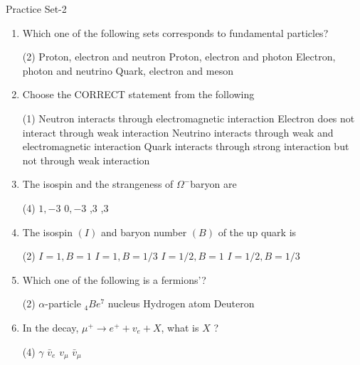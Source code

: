 \begin{abox}
Practice Set-2
\end{abox}
\begin{enumerate}
	\item  Which one of the following sets corresponds to fundamental particles?
	 {}
	 \begin{tasks}(2)
		\task[\textbf{a.}]Proton, electron and neutron
		\task[\textbf{b.}]Proton, electron and photon
		\task[\textbf{c.}]Electron, photon and neutrino
		\task[\textbf{d.}]Quark, electron and meson 
	\end{tasks}

	\item  Choose the CORRECT statement from the following
	 \begin{tasks}(1)
		\task[\textbf{a.}]Neutron interacts through electromagnetic interaction
		\task[\textbf{b.}]Electron does not interact through weak interaction
		\task[\textbf{c.}]Neutrino interacts through weak and electromagnetic interaction
		\task[\textbf{d.}] Quark interacts through strong interaction but not through weak interaction
	\end{tasks}

	\item  The isospin and the strangeness of $\Omega^{-}$baryon are
	{}
	 \begin{tasks}(4)
		\task[\textbf{a.}]$1,-3$
		\task[\textbf{b.}]$0,-3$
		,3
		,3 
	\end{tasks}

	\item The isospin $(I)$ and baryon number $(B)$ of the up quark is
	{}
	 \begin{tasks}(2)
		\task[\textbf{a.}]$I=1, B=1$
		\task[\textbf{b.}]$I=1, B=1 / 3$
		\task[\textbf{c.}]$I=1 / 2, B=1$
		\task[\textbf{d.}]$I=1 / 2, B=1 / 3$ 
	\end{tasks}

	\item  Which one of the following is a fermions'?
	{}
	 \begin{tasks}(2)
		\task[\textbf{a.}]$\alpha$-particle
		\task[\textbf{b.}]${ }_4 B e^7$ nucleus
		\task[\textbf{c.}]Hydrogen atom
		\task[\textbf{d.}]Deuteron 
	\end{tasks}

	\item  In the decay, $\mu^{+} \rightarrow e^{+}+v_e+X$, what is $X$ ?
	{}
	 \begin{tasks}(4)
		\task[\textbf{a.}]$\gamma$
		\task[\textbf{b.}]$\bar{v}_e$
		\task[\textbf{c.}]$v_\mu$
		\task[\textbf{d.}]$\bar{v}_\mu$ 
	\end{tasks}


\end{enumerate}
